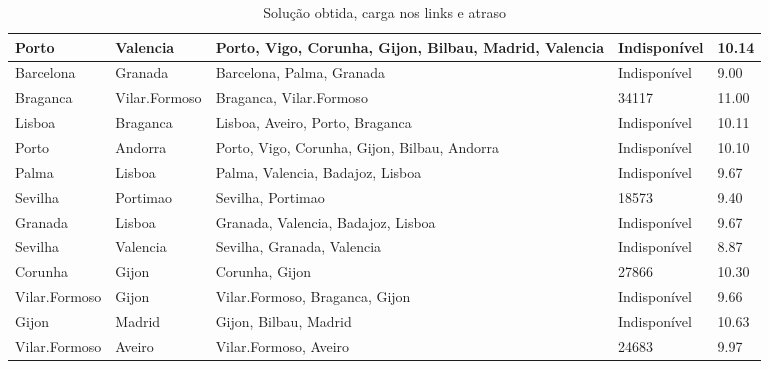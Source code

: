\begin{table}[!htb]
{\begin{tabular}{|l|l|l|l|l|}
Porto & Valencia & Porto, Vigo, Corunha, Gijon, Bilbau, Madrid, Valencia & Indisponível & 10.14 \\ \hline
Barcelona & Granada & Barcelona, Palma, Granada & Indisponível & 9.00 \\ \hline
Braganca & Vilar.Formoso & Braganca, Vilar.Formoso & 34117 & 11.00 \\ \hline
Lisboa & Braganca & Lisboa, Aveiro, Porto, Braganca & Indisponível & 10.11 \\ \hline
Porto & Andorra & Porto, Vigo, Corunha, Gijon, Bilbau, Andorra & Indisponível & 10.10 \\ \hline
Palma & Lisboa & Palma, Valencia, Badajoz, Lisboa & Indisponível & 9.67 \\ \hline
Sevilha & Portimao & Sevilha, Portimao & 18573 & 9.40 \\ \hline
Granada & Lisboa & Granada, Valencia, Badajoz, Lisboa & Indisponível & 9.67 \\ \hline
Sevilha & Valencia & Sevilha, Granada, Valencia & Indisponível & 8.87 \\ \hline
Corunha & Gijon & Corunha, Gijon & 27866 & 10.30 \\ \hline
Vilar.Formoso & Gijon & Vilar.Formoso, Braganca, Gijon & Indisponível & 9.66 \\ \hline
Gijon & Madrid & Gijon, Bilbau, Madrid & Indisponível & 10.63 \\ \hline
Vilar.Formoso & Aveiro & Vilar.Formoso, Aveiro & 24683 & 9.97 \\ \hline
\end{tabular}}
\caption[]{Solução obtida, carga nos links e atraso}
\end{table}

\begin{table}[!htb]
        \centering
\caption[]{Solução obtida, carga nos links e atraso}
\end{table}


